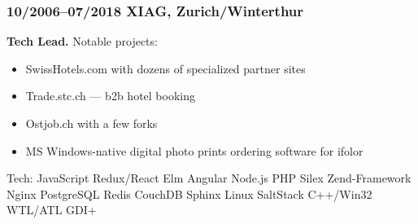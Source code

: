 \documentclass[a4paper, twocolumn, 10pt]{article}
\begin{document}
\subsubsection*{10/2006--07/2018 XIAG, Zurich/Winterthur}

\noindent \textbf{Tech Lead.} Notable projects:

\begin{itemize}
  \item SwissHotels.com with dozens of specialized partner sites
  \item Trade.stc.ch — b2b hotel booking
  \item Ostjob.ch with a few forks
  \item MS Windows-native digital photo prints ordering software for ifolor
\end{itemize}

\noindent Tech: JavaScript Redux/React Elm Angular Node.js PHP Silex Zend-Framework Nginx PostgreSQL
Redis CouchDB Sphinx Linux SaltStack C++/Win32 WTL/ATL GDI+
\end{document}
